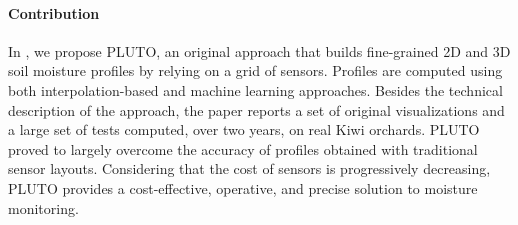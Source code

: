 \paragraph{Contribution} In , we propose PLUTO, an original approach that builds fine-grained 2D and 3D soil moisture profiles by relying on a grid of sensors.
Profiles are computed using both interpolation-based and machine learning approaches.
Besides the technical description of the approach, the paper reports a set of original visualizations and a large set of tests computed, over two years, on real Kiwi orchards.
PLUTO proved to largely overcome the accuracy of profiles obtained with traditional sensor layouts.
Considering that the cost of sensors is progressively decreasing, PLUTO provides a cost-effective, operative, and precise solution to moisture monitoring.






